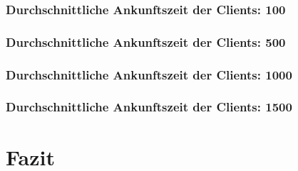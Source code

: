 \subsubsection{Durchschnittliche Ankunftszeit der Clients: 100}
\subsubsection{Durchschnittliche Ankunftszeit der Clients: 500}
\subsubsection{Durchschnittliche Ankunftszeit der Clients: 1000}
\subsubsection{Durchschnittliche Ankunftszeit der Clients: 1500}

\section{Fazit}


